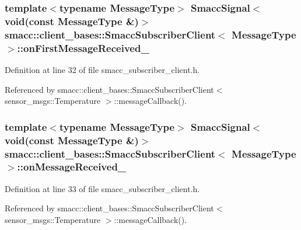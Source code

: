 \subsubsection[{\texorpdfstring{on\+First\+Message\+Received\+\_\+}{onFirstMessageReceived_}}]{\setlength{\rightskip}{0pt plus 5cm}template$<$typename Message\+Type$>$ {\bf Smacc\+Signal}$<$void(const Message\+Type \&)$>$ {\bf smacc\+::client\+\_\+bases\+::\+Smacc\+Subscriber\+Client}$<$ Message\+Type $>$\+::on\+First\+Message\+Received\+\_\+}\hypertarget{classsmacc_1_1client__bases_1_1SmaccSubscriberClient_aeb31fdb287bb54c4d9b7dffff416a857}{}\label{classsmacc_1_1client__bases_1_1SmaccSubscriberClient_aeb31fdb287bb54c4d9b7dffff416a857}


Definition at line 32 of file smacc\+\_\+subscriber\+\_\+client.\+h.



Referenced by smacc\+::client\+\_\+bases\+::\+Smacc\+Subscriber\+Client$<$ sensor\+\_\+msgs\+::\+Temperature $>$\+::message\+Callback().

\subsubsection[{\texorpdfstring{on\+Message\+Received\+\_\+}{onMessageReceived_}}]{\setlength{\rightskip}{0pt plus 5cm}template$<$typename Message\+Type$>$ {\bf Smacc\+Signal}$<$void(const Message\+Type \&)$>$ {\bf smacc\+::client\+\_\+bases\+::\+Smacc\+Subscriber\+Client}$<$ Message\+Type $>$\+::on\+Message\+Received\+\_\+}\hypertarget{classsmacc_1_1client__bases_1_1SmaccSubscriberClient_aa1c39106c9250632bfb5a22137601026}{}\label{classsmacc_1_1client__bases_1_1SmaccSubscriberClient_aa1c39106c9250632bfb5a22137601026}


Definition at line 33 of file smacc\+\_\+subscriber\+\_\+client.\+h.



Referenced by smacc\+::client\+\_\+bases\+::\+Smacc\+Subscriber\+Client$<$ sensor\+\_\+msgs\+::\+Temperature $>$\+::message\+Callback().

